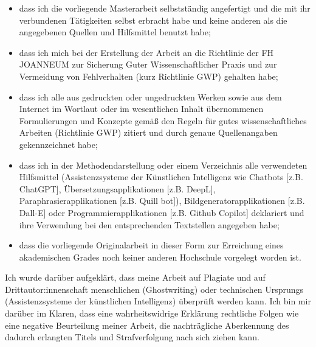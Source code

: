 {    \begin{itemize}
        \item dass ich die vorliegende Masterarbeit selbstständig angefertigt und die mit ihr verbundenen Tätigkeiten selbst erbracht habe und keine anderen als die angegebenen Quellen und Hilfsmittel benutzt habe;
        \item dass ich mich bei der Erstellung der Arbeit an die Richtlinie der FH JOANNEUM zur Sicherung Guter Wissenschaftlicher Praxis und zur Vermeidung von Fehlverhalten (kurz Richtlinie GWP) gehalten habe;
        \item dass ich alle aus gedruckten oder ungedruckten Werken sowie aus dem Internet im Wortlaut oder im wesentlichen Inhalt übernommenen Formulierungen und Konzepte gemäß den Regeln für gutes wissenschaftliches Arbeiten (Richtlinie GWP) zitiert und durch genaue Quellenangaben gekennzeichnet habe;
        \item dass ich in der Methodendarstellung oder einem Verzeichnis alle verwendeten Hilfsmittel (Assistenzsysteme der Künstlichen Intelligenz wie Chatbots [z.B. ChatGPT], Übersetzungsapplikationen [z.B. DeepL], Paraphrasierapplikationen [z.B. Quill bot]), Bildgeneratorapplikationen [z.B. Dall-E] oder Programmierapplikationen [z.B. Github Copilot] deklariert und ihre Verwendung bei den entsprechenden Textstellen angegeben habe;
        \item dass die vorliegende Originalarbeit in dieser Form zur Erreichung eines akademischen Grades noch keiner anderen Hochschule vorgelegt worden ist.
    \end{itemize}

    Ich wurde darüber aufgeklärt, dass meine Arbeit auf Plagiate und auf Drittautor:innenschaft menschlichen (Ghostwriting) oder technischen Ursprungs (Assistenzsysteme der künstlichen Intelligenz) überprüft werden kann. Ich bin mir darüber im Klaren, dass eine wahrheitswidrige Erklärung rechtliche Folgen wie eine negative Beurteilung meiner Arbeit, die nachträgliche Aberkennung des dadurch erlangten Titels und Strafverfolgung nach sich ziehen kann.

}